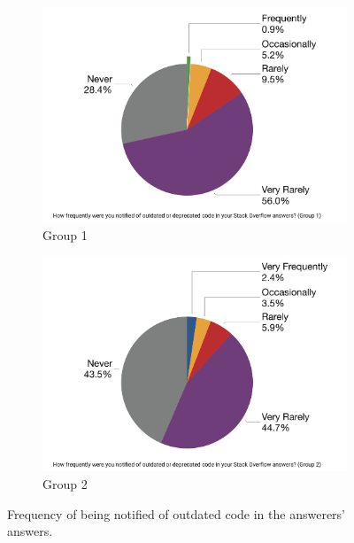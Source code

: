 \documentclass{svjour3}                     %
\begin{document}
\begin{figure}
	\begin{subfigure}{.5\textwidth}
		\centering
		\includegraphics[width=.8\linewidth]{survey_outdated_freq_1}
		\caption{Group 1}
		\label{fig:survey_outdated_freq_1}
	\end{subfigure}%
	\begin{subfigure}{.5\textwidth}
		\centering
		\includegraphics[width=.8\linewidth]{survey_outdated_freq_2}
		\caption{Group 2}
		\label{fig:survey_outdated_freq_2}
	\end{subfigure}
	\caption{Frequency of being notified of outdated code in the answerers' answers.}
	\label{fig:survey_outdated_freq}
\end{figure}
\end{document}
